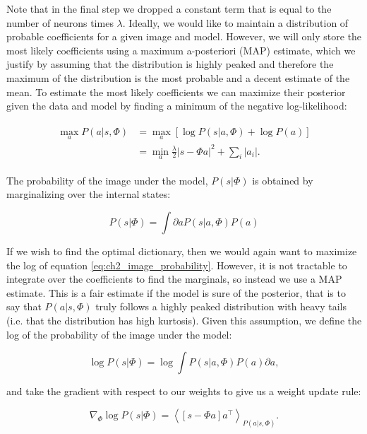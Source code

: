 Note that in the final step we dropped a constant term that is equal to the number of neurons times $\lambda$. Ideally, we would like to maintain a distribution of probable coefficients for a given image and model. However, we will only store the most likely coefficients using a maximum a-posteriori (MAP) estimate, which we justify by assuming that the distribution is highly peaked and therefore the maximum of the distribution is the most probable and a decent estimate of the mean. To estimate the most likely coefficients we can maximize their posterior given the data and model by finding a minimum of the negative log-likelihood:

\begin{align}\label{eq:ch2_min_log_likelihood}
\begin{split}
    \max_{a} P(a|s,\Phi) &= \max_{a}\left[\log{P(s|a,\Phi)} + \log{P(a)}\right] \\
                         &= \min_{a}\frac{\lambda}{2}|s - \Phi a|^{2} + \sum_{i}|a_{i}|.
\end{split}
\end{align}

The probability of the image under the model, $P(s|\Phi)$ is obtained by marginalizing over the internal states:

\begin{equation}\label{eq:ch2_image_probability}
    P(s|\Phi) = \int\partial a P(s|a,\Phi) P(a)
\end{equation}

If we wish to find the optimal dictionary, then we would again want to maximize the log of equation \ref{eq:ch2_image_probability}. However, it is not tractable to integrate over the coefficients to find the marginals, so instead we use a MAP estimate. This is a fair estimate if the model is sure of the posterior, that is to say that $P(a|s,\Phi)$ truly follows a highly peaked distribution with heavy tails (i.e. that the distribution has high kurtosis). Given this assumption, we define the log of the probability of the image under the model:

\begin{equation}\label{eq:ch2_log_image_probability}
    \log{P(s|\Phi)} = \log{\int P(s|a,\Phi)P(a)\partial a},
\end{equation}

\noindent and take the gradient with respect to our weights to give us a weight update rule:

\begin{equation}\label{eq:ch2_probability_weight_update}
    \nabla_{\Phi} \log{P(s|\Phi)} = \left< \left[s - \Phi a\right]a^{\top}\right>_{P(a|s,\Phi)}.
\end{equation}


